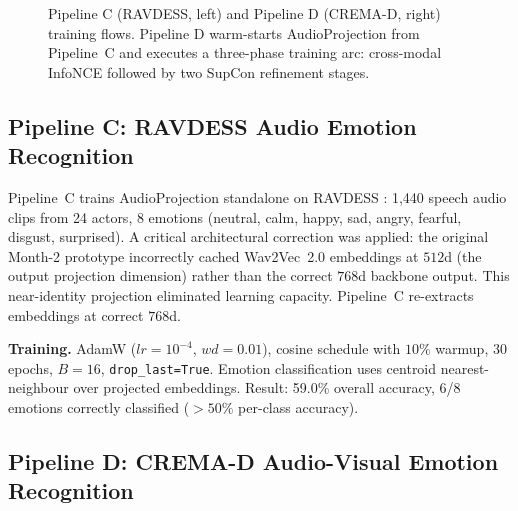 \documentclass[10pt,conference]{IEEEtran}
\theoremstyle{ieeethm}
\theoremstyle{ieeedef}
\theoremstyle{ieeeremark}
\begin{document}
\begin{figure}[!t]
{}
\caption{Pipeline C (RAVDESS, left) and Pipeline D (CREMA-D, right) training flows. Pipeline D warm-starts AudioProjection from Pipeline~C and executes a three-phase training arc: cross-modal InfoNCE followed by two SupCon refinement stages.}
\label{fig:pipelineCD}
\end{figure}

\subsection{Pipeline C: RAVDESS Audio Emotion Recognition}

Pipeline~C trains AudioProjection standalone on RAVDESS \cite{livingstone2018ryerson}: 1,440 speech audio clips from 24 actors, 8 emotions (neutral, calm, happy, sad, angry, fearful, disgust, surprised). A critical architectural correction was applied: the original Month-2 prototype incorrectly cached Wav2Vec~2.0 embeddings at $512$d (the output projection dimension) rather than the correct $768$d backbone output. This near-identity projection eliminated learning capacity. Pipeline~C re-extracts embeddings at correct $768$d.

\textbf{Training.} AdamW ($lr{=}10^{-4}$, $wd{=}0.01$), cosine schedule with $10\%$ warmup, $30$ epochs, $B{=}16$, \texttt{drop\_last=True}. Emotion classification uses centroid nearest-neighbour over projected embeddings. Result: 59.0\% overall accuracy, 6/8 emotions correctly classified ($>50\%$ per-class accuracy).

\subsection{Pipeline D: CREMA-D Audio-Visual Emotion Recognition}
\end{document}
